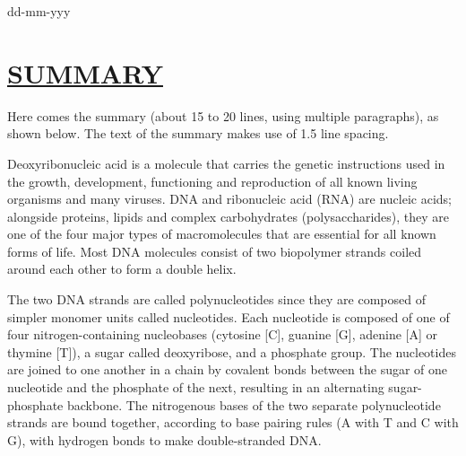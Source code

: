 \documentclass{article}
\begin{document}
{{{{{{{\vspace*{1cm}
 \hspace{2cm} dd-mm-yyy
\pagebreak

\section*{\uline{SUMMARY}}
Here comes the summary (about 15 to 20 lines, using multiple paragraphs), as shown below. The text of the summary makes use of 1.5 line spacing.

\bigskip

\noindent Deoxyribonucleic acid is a molecule that carries the genetic instructions used in the growth, development, functioning and reproduction of all known living organisms and many viruses. DNA and ribonucleic acid (RNA) are nucleic acids; alongside proteins, lipids and complex carbohydrates (polysaccharides), they are one of the four major types of macromolecules that are essential for all known forms of life. Most DNA molecules consist of two biopolymer strands coiled around each other to form a double helix.

\bigskip

\noindent The two DNA strands are called polynucleotides since they are composed of simpler monomer units called nucleotides. Each nucleotide is composed of one of four nitrogen-containing nucleobases (cytosine [C], guanine [G], adenine [A] or thymine [T]), a sugar called deoxyribose, and a phosphate group. The nucleotides are joined to one another in a chain by covalent bonds between the sugar of one nucleotide and the phosphate of the next, resulting in an alternating sugar-phosphate backbone. The nitrogenous bases of the two separate polynucleotide strands are bound together, according to base pairing rules (A with T and C with G), with hydrogen bonds to make double-stranded DNA.

\vspace{1cm}

}}}}}}}
\end{document}
